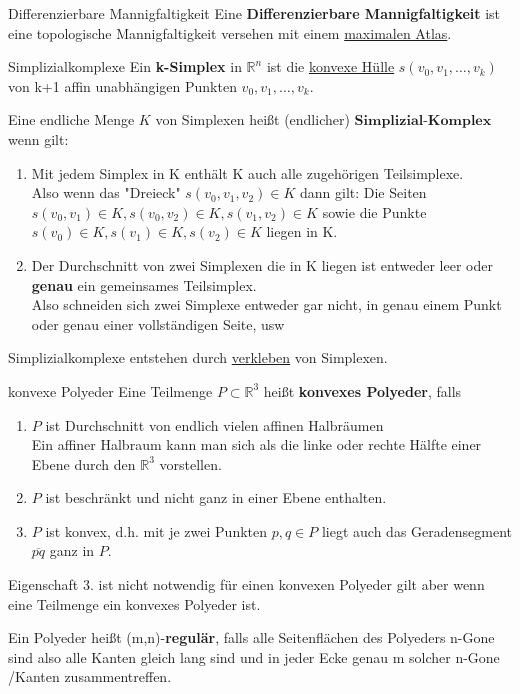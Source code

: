 \begin{titleDef}{Differenzierbare Mannigfaltigkeit}
\label{diffMannigfaltigkeit}
Eine \textbf{Differenzierbare Mannigfaltigkeit} ist eine topologische Mannigfaltigkeit versehen mit einem \hyperref[maxAtlas]{maximalen Atlas}.
\end{titleDef}

\begin{titleDef}{Simplizialkomplexe}
\label{simplex}
Ein \textbf{k-Simplex} in $\mathbb{R}^n$ ist die \hyperref[konvHuelle]{konvexe Hülle} $s(v_0,v_1,\ldots,v_k)$ von k+1 affin unabhängigen Punkten $v_0,v_1,\ldots,v_k$.\par
Eine endliche Menge $K$ von Simplexen heißt (endlicher) $\textbf{Simplizial-Komplex}$ wenn gilt:
\begin{enumerate}
	\item Mit jedem Simplex in K enthält K auch alle zugehörigen Teilsimplexe.\\Also wenn das "Dreieck" $s(v_0,v_1,v_2)\in K$ dann gilt: Die Seiten $s(v_0,v_1)\in K,s(v_0,v_2)\in K,s(v_1,v_2)\in K$ sowie die Punkte $s(v_0)\in K,s(v_1)\in K,s(v_2)\in K$ liegen in K.
	\item Der Durchschnitt von zwei Simplexen die in K liegen ist entweder leer oder \textbf{genau} ein gemeinsames Teilsimplex.\\
	Also schneiden sich zwei Simplexe entweder gar nicht, in genau einem Punkt oder genau einer vollständigen Seite, usw
\end{enumerate}
Simplizialkomplexe entstehen durch \hyperref[verklebung]{verkleben} von Simplexen.
\end{titleDef}

\begin{titleDef}{konvexe Polyeder}
\label{konvexPoly}
Eine Teilmenge $P\subset\mathbb{R}^3$ heißt \textbf{konvexes Polyeder}, falls
\begin{enumerate}
	\item $P$ ist Durchschnitt von endlich vielen affinen Halbräumen\\
	Ein affiner Halbraum kann man sich als die linke oder rechte Hälfte einer Ebene durch den $\mathbb{R}^3$ vorstellen.
	\item $P$ ist beschränkt und nicht ganz in einer Ebene enthalten.
	\item $P$ ist konvex, d.h. mit je zwei Punkten $p,q\in P$ liegt auch das Geradensegment $\overline{pq}$ ganz in $P$.
\end{enumerate}
Eigenschaft 3. ist nicht notwendig für einen konvexen Polyeder gilt aber wenn eine Teilmenge ein konvexes Polyeder ist.\par
Ein Polyeder heißt (m,n)-\textbf{regulär}, falls alle Seitenflächen des Polyeders n-Gone sind also alle Kanten gleich lang sind und in jeder Ecke genau m solcher n-Gone /Kanten zusammentreffen.
\end{titleDef}

